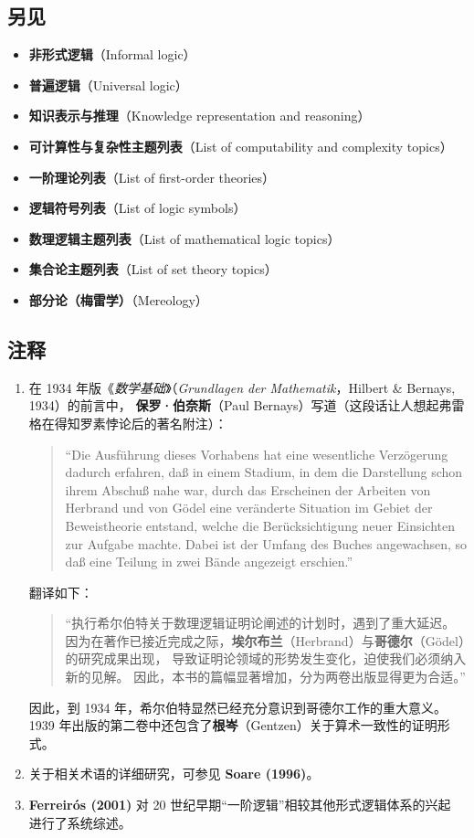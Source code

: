 \subsection{另见}
\begin{itemize}
  \item \textbf{非形式逻辑}（Informal logic）
  \item \textbf{普遍逻辑}（Universal logic）
  \item \textbf{知识表示与推理}（Knowledge representation and reasoning）
  \item \textbf{可计算性与复杂性主题列表}（List of computability and complexity topics）
  \item \textbf{一阶理论列表}（List of first-order theories）
  \item \textbf{逻辑符号列表}（List of logic symbols）
  \item \textbf{数理逻辑主题列表}（List of mathematical logic topics）
  \item \textbf{集合论主题列表}（List of set theory topics）
  \item \textbf{部分论（梅雷学）}（Mereology）
\end{itemize}
\subsection{注释}
\begin{enumerate}
  \item 在 1934 年版《\textit{数学基础}》（\textit{Grundlagen der Mathematik}，Hilbert \& Bernays, 1934）的前言中，  
  \textbf{保罗·伯奈斯}（Paul Bernays）写道（这段话让人想起弗雷格在得知罗素悖论后的著名附注）：
  \begin{quote}
  “Die Ausführung dieses Vorhabens hat eine wesentliche Verzögerung dadurch erfahren, daß in einem Stadium, in dem die Darstellung schon ihrem Abschuß nahe war, durch das Erscheinen der Arbeiten von Herbrand und von Gödel eine veränderte Situation im Gebiet der Beweistheorie entstand, welche die Berücksichtigung neuer Einsichten zur Aufgabe machte. Dabei ist der Umfang des Buches angewachsen, so daß eine Teilung in zwei Bände angezeigt erschien.”
  \end{quote}

  翻译如下：
  \begin{quote}
  “执行希尔伯特关于数理逻辑证明论阐述的计划时，遇到了重大延迟。  
  因为在著作已接近完成之际，\textbf{埃尔布兰}（Herbrand）与\textbf{哥德尔}（Gödel）的研究成果出现，  
  导致证明论领域的形势发生变化，迫使我们必须纳入新的见解。  
  因此，本书的篇幅显著增加，分为两卷出版显得更为合适。”
  \end{quote}

  因此，到 1934 年，希尔伯特显然已经充分意识到哥德尔工作的重大意义。  
  1939 年出版的第二卷中还包含了\textbf{根岑}（Gentzen）关于算术一致性的证明形式。

  \item 关于相关术语的详细研究，可参见 \textbf{Soare (1996)}。

  \item \textbf{Ferreirós (2001)} 对 20 世纪早期“一阶逻辑”相较其他形式逻辑体系的兴起  
  进行了系统综述。
\end{enumerate}


